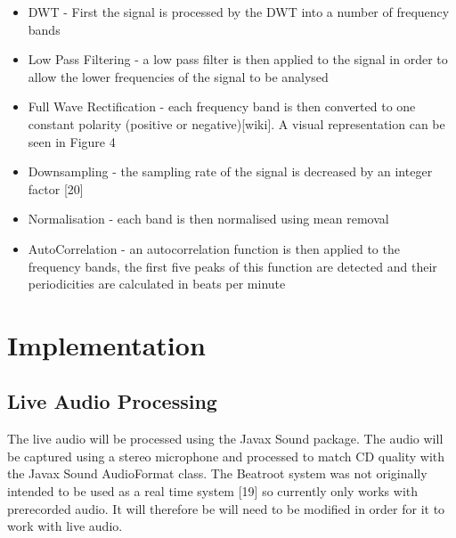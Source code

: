 \documentclass[a4paper, 11pt]{article}
\begin{document}
\begin{itemize}
\item DWT - First the signal is processed by the DWT into a number of frequency bands 
\item Low Pass Filtering - a low pass filter is then applied to the signal in order to allow the lower frequencies of the signal to be analysed
\item Full Wave Rectification - each frequency band is then converted to one constant polarity (positive or negative)[wiki]. A visual representation can be seen in Figure 4
\item Downsampling - the sampling rate of the signal is decreased by an integer factor [20]
\item Normalisation - each band is then normalised using mean removal
\item AutoCorrelation - an autocorrelation function is then applied to the frequency bands, the first five peaks of this function are detected and their periodicities are calculated in beats per minute
\end{itemize}















\maketitle{} \section{Implementation}
\subsection{Live Audio Processing}
The live audio will be processed using the Javax Sound package. The audio will be captured using a stereo microphone and processed to match CD quality with the Javax Sound AudioFormat class. The Beatroot system was not originally intended to be used as a real time system [19] so currently only works with prerecorded audio. It will therefore be will need to be modified in order for it to work with live audio. 
\end{document}
